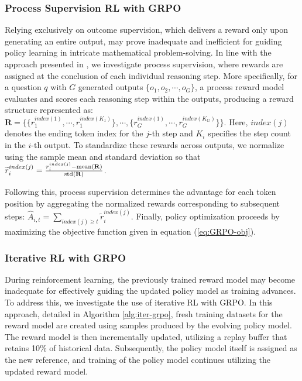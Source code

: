 \begin{itemize}[topsep=0pt]
\subsubsection{Process Supervision RL with GRPO}  
Relying exclusively on outcome supervision, which delivers a reward only upon generating an entire output, may prove inadequate and inefficient for guiding policy learning in intricate mathematical problem-solving. In line with the approach presented in \cite{wang2023math}, we investigate process supervision, where rewards are assigned at the conclusion of each individual reasoning step. More specifically, for a question $q$ with $G$ generated outputs $\{o_1, o_2, \cdots, o_G\}$, a process reward model evaluates and scores each reasoning step within the outputs, producing a reward structure represented as: $\mathbf{R} = \{ \{r_1^{index(1)},\cdots,r_1^{index(K_1)}\}, \cdots,  \{r_G^{index(1)},\cdots,r_G^{index(K_G)}\} \}$. Here, $index(j)$ denotes the ending token index for the $j$-th step and $K_i$ specifies the step count in the $i$-th output. To standardize these rewards across outputs, we normalize using the sample mean and standard deviation so that $\widetilde{r}_i^{index(j)} = \frac{r_i^{index(j)} - {\rm mean(\mathbf{R})}}{{\rm std(\mathbf{R})}}$.

Following this, process supervision determines the advantage for each token position by aggregating the normalized rewards corresponding to subsequent steps: $\hat{A}_{i, t} = \sum_{index(j) \ge t} \widetilde{r}_i^{index(j)}$.
Finally, policy optimization proceeds by maximizing the objective function given in equation (\ref{eq:GRPO-obj}).

\subsubsection{Iterative RL with GRPO} During reinforcement learning, the previously trained reward model may become inadequate for effectively guiding the updated policy model as training advances. To address this, we investigate the use of iterative RL with GRPO. In this approach, detailed in Algorithm \ref{alg:iter-grpo}, fresh training datasets for the reward model are created using samples produced by the evolving policy model. The reward model is then incrementally updated, utilizing a replay buffer that retains 10\% of historical data. Subsequently, the policy model itself is assigned as the new reference, and training of the policy model continues utilizing the updated reward model.


\end{itemize}

